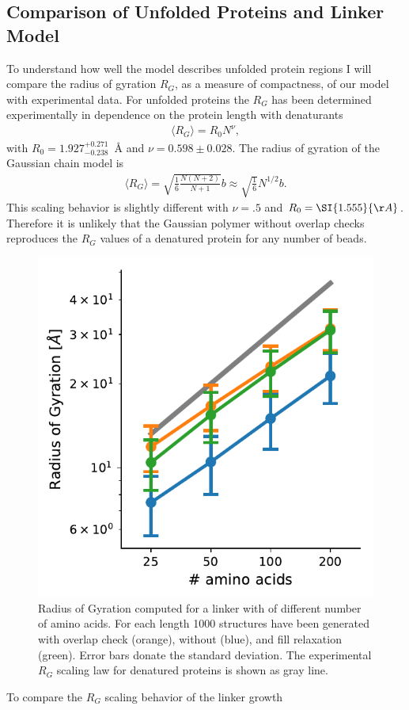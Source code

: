 \documentclass[12pt, twoside]{report}
\begin{document}
\subsection{Comparison of Unfolded Proteins and Linker Model} To understand
how well the model describes unfolded protein regions I will compare the radius
of gyration $R_G$, as a measure of compactness, of our model with experimental
data. For unfolded proteins the $R_G$ has been determined experimentally in
dependence on the protein length with denaturants \cite{Kohn2004}
\begin{align}
  \label{eq:ch5:plaxco} \langle R_G\rangle = R_0 N^{\nu},
\end{align} with \(R_0=1.927_{-0.238}^{+0.271}\)\SI{}{\AA} and \(\nu=0.598 \pm
0.028\). The radius of gyration of the Gaussian chain model is
\begin{align}
\label{eq:ch5:rg} \langle R_G\rangle = \sqrt{\frac{1}{6} \frac{N (N+2)}{N+1}} b
\approx \sqrt{\frac{1}{6}} N^{1/2} b.
\end{align} This scaling behavior is slightly different with \(\nu=.5\) and
\(R_0=\SI{1.555}{\AA}\). Therefore it is unlikely that the Gaussian polymer
without overlap checks reproduces the $R_G$ values of a denatured protein for
any number of beads.
\begin{figure}[!ht]
  \centering \includegraphics{figures/plaxco}
  \caption[Radius of gyration of Gaussian polymer chain for different chain
  lengths.]{Radius of Gyration computed for a linker with of different number of
    amino acids. For each length 1000 structures have been generated with
    overlap check (orange), without (blue), and fill relaxation (green). Error
    bars donate the standard deviation. The experimental $R_G$ scaling law for
    denatured proteins \cite{Kohn2004} is shown as gray line.}
\label{fig:plaxco}
\end{figure} To compare the \(R_G\) scaling behavior of the linker growth
\end{document}

